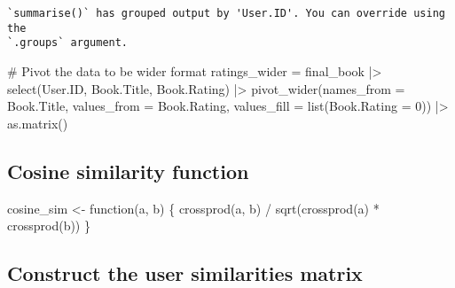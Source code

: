 \documentclass[
]{report}
\newenvironment{Shaded}{\begin{snugshade}}{\end{snugshade}}
\newcommand{\AttributeTok}[1]{\textcolor[rgb]{0.40,0.45,0.13}{#1}}
\newcommand{\CommentTok}[1]{\textcolor[rgb]{0.37,0.37,0.37}{#1}}
\newcommand{\ControlFlowTok}[1]{\textcolor[rgb]{0.00,0.23,0.31}{#1}}
\newcommand{\DecValTok}[1]{\textcolor[rgb]{0.68,0.00,0.00}{#1}}
\newcommand{\FunctionTok}[1]{\textcolor[rgb]{0.28,0.35,0.67}{#1}}
\newcommand{\NormalTok}[1]{\textcolor[rgb]{0.00,0.23,0.31}{#1}}
\newcommand{\OtherTok}[1]{\textcolor[rgb]{0.00,0.23,0.31}{#1}}
\newcommand{\SpecialCharTok}[1]{\textcolor[rgb]{0.37,0.37,0.37}{#1}}
\begin{document}
\begin{verbatim}
`summarise()` has grouped output by 'User.ID'. You can override using the
`.groups` argument.
\end{verbatim}

\begin{Shaded}
\begin{Highlighting}[]
\CommentTok{\# Pivot the data to be wider format}
\NormalTok{ratings\_wider }\OtherTok{=}\NormalTok{ final\_book }\SpecialCharTok{|\textgreater{}} 
  \FunctionTok{select}\NormalTok{(User.ID, Book.Title, Book.Rating) }\SpecialCharTok{|\textgreater{}}
  \FunctionTok{pivot\_wider}\NormalTok{(}\AttributeTok{names\_from =}\NormalTok{ Book.Title, }
              \AttributeTok{values\_from =}\NormalTok{ Book.Rating, }
              \AttributeTok{values\_fill =} \FunctionTok{list}\NormalTok{(}\AttributeTok{Book.Rating =} \DecValTok{0}\NormalTok{)) }\SpecialCharTok{|\textgreater{}} \FunctionTok{as.matrix}\NormalTok{()}
\end{Highlighting}
\end{Shaded}

\subsection{Cosine similarity
function}\label{cosine-similarity-function}

\begin{Shaded}
\begin{Highlighting}[]
\NormalTok{cosine\_sim }\OtherTok{\textless{}{-}} \ControlFlowTok{function}\NormalTok{(a, b) \{}
  \FunctionTok{crossprod}\NormalTok{(a, b) }\SpecialCharTok{/} \FunctionTok{sqrt}\NormalTok{(}\FunctionTok{crossprod}\NormalTok{(a) }\SpecialCharTok{*} \FunctionTok{crossprod}\NormalTok{(b))}
\NormalTok{\}}
\end{Highlighting}
\end{Shaded}

\subsection{Construct the user similarities
matrix}\label{construct-the-user-similarities-matrix}
\end{document}
